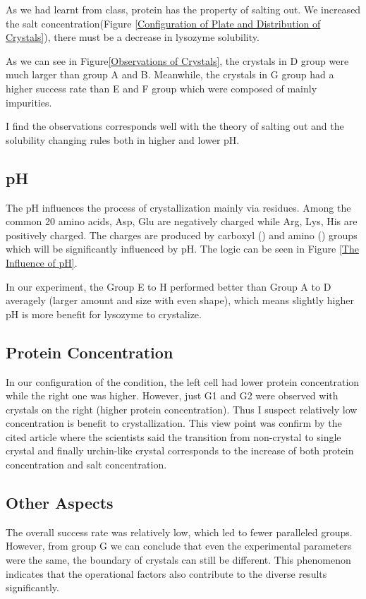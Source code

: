 \documentclass[UTF-8]{article}
\begin{document}
As we had learnt from class, protein has the property of salting out.
We increased the salt concentration(Figure \ref{Configuration of Plate and Distribution of Crystals}), there must be a decrease in lysozyme solubility.

As we can see in Figure\ref{Observations of Crystals}, the crystals in D group were much larger than group A and B.
Meanwhile, the crystals in G group had a higher success rate than E and F group which were composed of mainly impurities.

I find the observations corresponds well with the theory of salting out and the solubility changing rules both in higher and lower pH.

\subsection{pH}
The pH influences the process of crystallization mainly via residues\cite{Protein_Crystallization_Wiki}.
Among the common 20 amino acids, Asp, Glu are negatively charged while Arg, Lys, His are positively charged.
The charges are produced by  carboxyl () and amino () groups which will be significantly influenced by pH.
The logic can be seen in Figure \ref{The Influence of pH}.

In our experiment, the Group E to H performed better than Group A to D averagely (larger amount and size with even shape), which means slightly higher pH is more benefit for lysozyme to crystalize.

\subsection{Protein Concentration}
In our configuration of the condition, the left cell had lower protein concentration while the right one was higher.
However, just G1 and G2 were observed with crystals on the right (higher protein concentration). Thus I suspect relatively low concentration is benefit to crystallization.
This view point was confirm by the cited article \cite{JIANG2023123187} where the scientists said the transition from non-crystal to single crystal and finally urchin-like crystal corresponds to the increase of both protein concentration and salt concentration.

\subsection{Other Aspects}
The overall success rate was relatively low, which led to fewer paralleled groups.
However, from group G we can conclude that even the experimental parameters were the same, the boundary of crystals can still be different.
This phenomenon indicates that the operational factors also contribute to the diverse results significantly.
\end{document}
